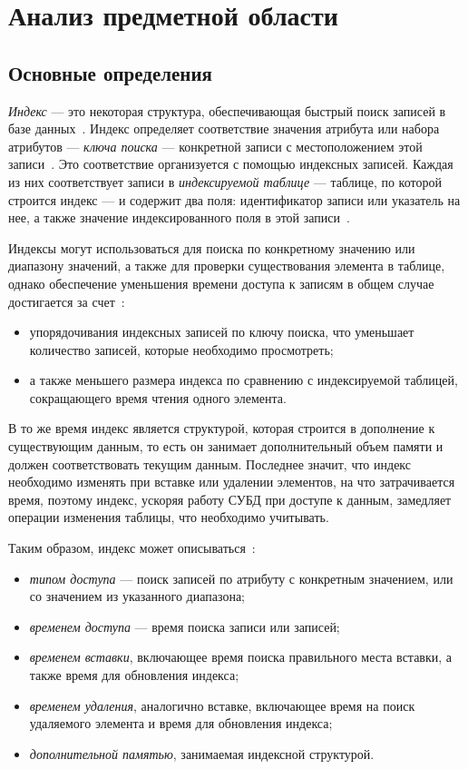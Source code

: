 \chapter{Анализ предметной области\label{analysis}}

\section{Основные определения}

\textit{Индекс} --- это некоторая структура, обеспечивающая быстрый поиск
записей в базе данных~\cite{amur}. Индекс определяет соответствие значения
атрибута или набора атрибутов --- \textit{ключа поиска} --- конкретной
записи с местоположением этой записи~\cite{ship}. Это соответствие организуется
с помощью индексных записей. Каждая из них соответствует записи в
\textit{индексируемой таблице} --- таблице, по которой строится индекс --- и
содержит два поля: идентификатор записи или указатель на нее, а также значение
индексированного поля в этой записи~\cite{syore}.

Индексы могут использоваться для поиска по конкретному значению или диапазону
значений, а также для проверки существования элемента в таблице, однако
обеспечение уменьшения времени доступа к записям в общем случае достигается за
счет~\cite{ship}:
\begin{itemize}
    \item упорядочивания индексных записей по ключу поиска, что уменьшает
        количество записей, которые необходимо просмотреть;
    \item а также меньшего размера индекса по сравнению с индексируемой
        таблицей, сокращающего время чтения одного элемента.
\end{itemize}

В то же время индекс является структурой, которая строится в дополнение к
существующим данным, то есть он занимает дополнительный объем памяти и должен
соответствовать текущим данным.  Последнее значит, что индекс необходимо
изменять при вставке или удалении элементов, на что затрачивается время, поэтому
индекс, ускоряя работу СУБД при доступе к данным, замедляет операции изменения
таблицы, что необходимо учитывать\cite{osip}.

Таким образом, индекс может описываться~\cite{ship}:
\begin{itemize}
    \item \textit{типом доступа} --- поиск записей по атрибуту с конкретным
        значением, или со значением из указанного диапазона;
    \item \textit{временем доступа} --- время поиска записи или записей;
    \item \textit{временем вставки}, включающее время поиска правильного места
        вставки, а также время для обновления индекса;
    \item \textit{временем удаления}, аналогично вставке, включающее время на поиск
        удаляемого элемента и время для обновления индекса;
    \item \textit{дополнительной памятью}, занимаемая индексной структурой.
\end{itemize}


